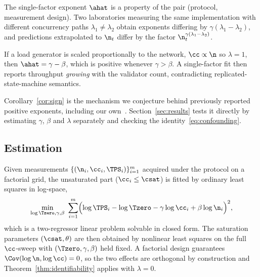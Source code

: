\begin{Corollary}
\label{cor:nontransfer}
The single-factor exponent $\ahat$ is a property of the pair (protocol,
measurement design). Two laboratories measuring the same implementation with
different concurrency paths $\lambda_{1}\ne\lambda_{2}$ obtain exponents
differing by $\gamma(\lambda_{1}-\lambda_{2})$, and predictions extrapolated to
$\n_{t}$ differ by the factor $\n_{t}^{\gamma(\lambda_{1}-\lambda_{2})}$.
\end{Corollary}

\begin{Corollary}
\label{cor:sign}
If a load generator is scaled proportionally to the network, $\cc\propto\n$
so $\lambda=1$, then $\ahat=\gamma-\beta$, which is positive whenever
$\gamma>\beta$. A single-factor fit then reports throughput \emph{growing} with
the validator count, contradicting replicated-state-machine semantics.
\end{Corollary}

Corollary~\ref{cor:sign} is the mechanism we conjecture behind previously
reported positive exponents, including our own~\cite{peniak2026a}.
Section~\ref{sec:results} tests it directly by estimating $\gamma$, $\beta$ and
$\lambda$ separately and checking the identity~\eqref{eq:confounding}.

\subsection{Estimation}

Given measurements $\{(\n_{i},\cc_{i},\TPS_{i})\}_{i=1}^{m}$ acquired under the
\RNM{} protocol on a factorial grid, the unsaturated part
($\cc_{i}\le\csat$) is fitted by ordinary least squares in log-space,
\begin{equation}
\min_{\log\Tzero,\gamma,\beta}\ \sum_{i=1}^{m}
\Bigl(\log\TPS_{i}-\log\Tzero-\gamma\log\cc_{i}+\beta\log\n_{i}\Bigr)^{2},
\label{eq:ols}
\end{equation}
which is a two-regressor linear problem solvable in closed form. The saturation
parameters $(\csat,\theta)$ are then obtained by nonlinear least squares
on the full $\cc$-sweep with $(\Tzero,\gamma,\beta)$ held fixed. A factorial
design guarantees $\Cov(\log\n,\log\cc)=0$, so the two effects are orthogonal by
construction and Theorem~\ref{thm:identifiability} applies with $\lambda=0$.

